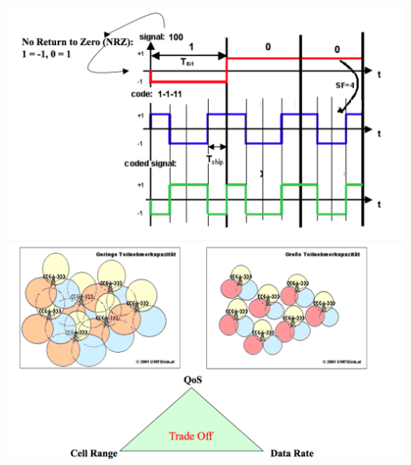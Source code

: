 \begin{minipage}{0.3\linewidth}
\includegraphics[width = \linewidth]{./Pics/UMTSCode}\\
\includegraphics[width = \linewidth]{./Pics/UMTSCellRange}\\
\end{minipage}
